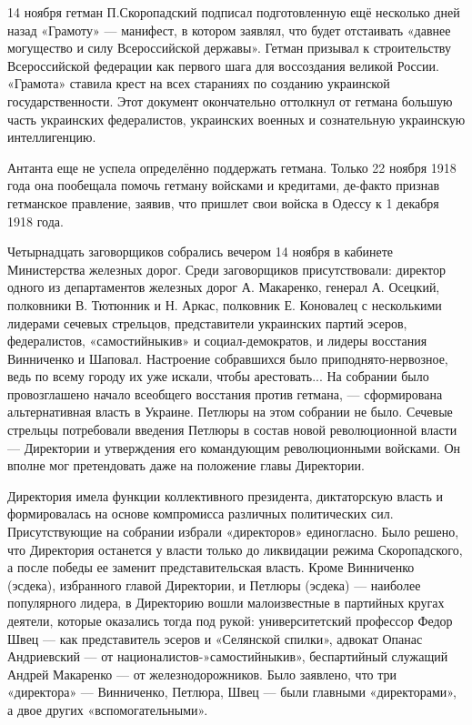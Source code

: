\begin{itemize}

14 ноября гетман П.Скоропадский подписал подготовленную ещё несколько дней
назад «Грамоту» — манифест, в котором заявлял, что будет отстаивать «давнее
могущество и силу Всероссийской державы». Гетман призывал к строительству
Всероссийской федерации как первого шага для воссоздания великой России.
«Грамота» ставила крест на всех стараниях по созданию украинской
государственности. Этот документ окончательно оттолкнул от гетмана большую
часть украинских федералистов, украинских военных и сознательную украинскую
интеллигенцию.

Антанта еще не успела определённо поддержать гетмана. Только 22 ноября 1918
года она пообещала помочь гетману войсками и кредитами, де-факто признав
гетманское правление, заявив, что пришлет свои войска в Одессу к 1 декабря 1918
года.

Четырнадцать заговорщиков собрались вечером 14 ноября в кабинете Министерства
железных дорог. Среди заговорщиков присутствовали: директор одного из
департаментов железных дорог А. Макаренко, генерал А. Осецкий, полковники В.
Тютюнник и Н. Аркас, полковник Е. Коновалец с несколькими лидерами сечевых
стрельцов, представители украинских партий эсеров, федералистов,
«самостийныкив» и социал-демократов, и лидеры восстания Винниченко и Шаповал.
Настроение собравшихся было приподнято-нервозное, ведь по всему городу их уже
искали, чтобы арестовать... На собрании было провозглашено начало всеобщего
восстания против гетмана, — сформирована альтернативная власть в Украине.
Петлюры на этом собрании не было. Сечевые стрельцы потребовали введения Петлюры
в состав новой революционной власти — Директории и утверждения его командующим
революционными войсками. Он вполне мог претендовать даже на положение главы
Директории.

Директория имела функции коллективного президента, диктаторскую власть и
формировалась на основе компромисса различных политических сил. Присутствующие
на собрании избрали «директоров» единогласно. Было решено, что Директория
останется у власти только до ликвидации режима Скоропадского, а после победы ее
заменит представительская власть. Кроме Винниченко (эсдека), избранного главой
Директории, и Петлюры (эсдека) — наиболее популярного лидера, в Директорию
вошли малоизвестные в партийных кругах деятели, которые оказались тогда под
рукой: университетский профессор Федор Швец — как представитель эсеров и
«Селянской спилки», адвокат Опанас Андриевский — от
националистов-»самостийныкив», беспартийный служащий Андрей Макаренко — от
железнодорожников. Было заявлено, что три «директора» — Винниченко, Петлюра,
Швец — были главными «директорами», а двое других «вспомогательными».


\end{itemize}
